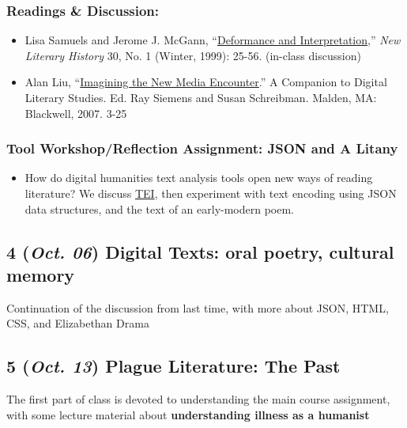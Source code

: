 \documentclass[11pt]{article}
\begin{document}
\subsubsection*{Readings \& Discussion:}
\label{sec:orgbd82012}
\begin{itemize}
\item Lisa Samuels and Jerome J. McGann, “\href{http://bf4dv7zn3u.search.serialssolutions.com.myaccess.library.utoronto.ca/?ctx\_ver=Z39.88-2004\&ctx\_enc=info\%253Aofi\%252Fenc\%253AUTF-8\&rfr\_id=info\%253Asid\%252Fsummon.serialssolutions.com\&rft\_val\_fmt=info\%253Aofi\%252Ffmt\%253Akev\%253Amtx\%253Ajournal\&rft.genre=article\&rft.atitle=Deformance+and+Interpretation\&rft.jtitle=New+Literary+History\%253A+a+journal+of+theory+and+interpretation\&rft.au=Samuels\%252C+Lisa\&rft.au=McGann\%252C+Jerome\&rft.date=1999\&rft.issn=0028-6087\&rft.eissn=1080-661X\&rft.volume=30\&rft.issue=1\&rft.spage=25\&rft.externalDocID=R03182533}{Deformance and Interpretation},” \emph{New Literary History} 30, No. 1 (Winter, 1999): 25-56. (in-class discussion)
\item Alan Liu, “\href{http://www.digitalhumanities.org/companion/view?docId=blackwell/9781405148641/9781405148641.xml\&chunk.id=ss1-3-1\&toc.depth=1\&toc.id=ss1-3-1\&brand=9781405148641\_brand}{Imagining the New Media Encounter}.” A Companion to Digital Literary Studies. Ed. Ray Siemens and Susan Schreibman. Malden, MA: Blackwell, 2007. 3-25
\end{itemize}
\subsubsection*{Tool Workshop/Reflection Assignment: JSON and A Litany}
\label{sec:orgbc70ce9}
\begin{itemize}
\item How do digital humanities text analysis tools open new ways of reading literature? We discuss  \href{https://tei-c.org/}{TEI}, then experiment with text encoding using JSON data structures, and the text of an early-modern poem.
\end{itemize}
\subsection*{4 (\textit{Oct. 06}) Digital Texts: oral poetry, cultural memory}
\label{sec:orgcfcfddf}
Continuation of the discussion from last time, with more about JSON, HTML, CSS, and Elizabethan Drama 
\subsection*{5 (\textit{Oct. 13}) Plague Literature: The Past}
\label{sec:orgdb63d4a}
The first part of class is devoted to understanding the main course assignment, with some lecture material about \textbf{understanding illness as a humanist}
\end{document}
